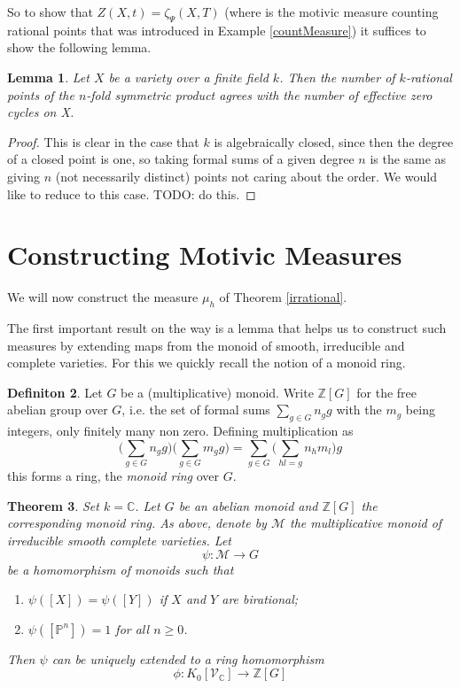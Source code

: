 \documentclass[11pt, a4paper, german]{article}
\theoremstyle{plain}
\newtheorem{theorem}{Theorem}[section]
\newtheorem{lemma}[theorem]{Lemma}
\theoremstyle{definition}
\newtheorem{definition}[theorem]{Definiton}
\newcommand{\gring}[1][k]{K_0[\mathcal{V}_#1]}
\begin{document}
So to show that $Z(X,t) = \zeta_{\Psi}(X,T)$ 
(where \Psi is the motivic measure counting rational points that was introduced in Example \ref{countMeasure}) 
it suffices to show the following lemma.

\begin{lemma}
    Let $X$ be a variety over a finite field $k$. Then the number of $k$-rational points of the $n$-fold symmetric product agrees
    with the number of effective zero cycles on X.
\end{lemma}
\begin{proof}
    This is clear in the case that $k$ is algebraically closed, since then the degree of a closed point is one, so taking formal sums of
    a given degree $n$ is the same as giving $n$ (not necessarily distinct) points not caring about the order.
    We would like to reduce to this case. TODO: do this.
\end{proof}

\section{Constructing Motivic Measures}
\label{const}
We will now construct the measure $\mu_h$ of Theorem \ref{irrational}.

The first important result on the way is a lemma that helps us to construct such measures by extending maps from the monoid of smooth, irreducible
and complete varieties. For this we quickly recall the notion of a monoid ring.

\begin{definition}
    Let $G$ be a (multiplicative) monoid. Write $\mathbb{Z}[G]$ for the free abelian group over $G$, i.e. the set of formal sums
    $\sum_{g \in G} n_g g$ with the $m_g$ being integers, only finitely many non zero.
    Defining multiplication as
    \[
        \Big(\sum_{g \in G} n_g g\Big)\Big(\sum_{g \in G} m_g g \Big) = \sum_{g \in G} \Big(\sum_{hl = g} n_h m_l\Big) g
    \]
    this forms a ring, the \emph{monoid ring} over $G$.
\end{definition}

\begin{theorem}
    \label{th1}
    Set $k = \mathbb{C}$. Let $G$ be an abelian monoid and $\mathbb{Z}[G]$ the corresponding monoid ring. As above, denote
    by $\mathcal{M}$ the multiplicative monoid of irreducible smooth complete varieties. Let
    \[
        \psi \colon \mathcal{M} \to G
    \]
    be a homomorphism of monoids such that
    \begin{enumerate}[label=\rm{\roman*)}]
        \item $\psi([X]) = \psi([Y])$ if $X$ and $Y$ are birational;
        \item $\psi([\mathbb{P}^n]) = 1$ for all $n \ge 0$.
    \end{enumerate}
    Then $\psi$ can be uniquely extended to a ring homomorphism 
    \[
        \phi \colon \gring[\mathbb{C}] \to \mathbb{Z} [G]
    \]
\end{theorem}
\end{document}
